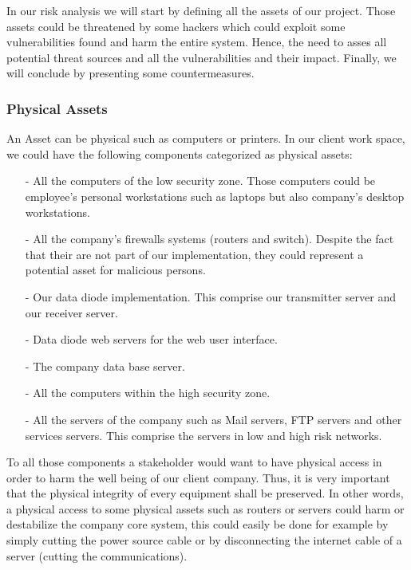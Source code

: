 \documentclass[a4paper,10pt]{article}
\begin{document}
In our risk analysis we will start by defining all the assets of our project. Those assets could be threatened by some hackers which could exploit some vulnerabilities found and harm the entire system. Hence, the need to asses all potential threat sources and all the vulnerabilities and their impact. Finally, we will conclude by presenting some countermeasures.

\subsubsection{Physical Assets}
An Asset can be physical such as computers or printers. In our client work space, we could have the following components categorized as physical assets:
\begin{enumerate}
\item[-] All the computers of the low security zone. Those computers could be employee's personal workstations such as laptops but also company's desktop workstations.
\item[-] All the company's firewalls systems (routers and switch). Despite the fact that their are not part of our implementation, they could represent a potential asset for malicious persons.
\item[-] Our data diode implementation. This comprise our transmitter server and our receiver server.
\item[-] Data diode web servers for the web user interface.
\item[-] The company data base server.
\item[-] All the computers within the high security zone.
\item[-] All the servers of the company such as Mail servers, FTP servers and other services servers. This comprise the servers in low and high risk networks.

\end{enumerate}
To all those components a stakeholder would want to have physical access in order to harm the well being of our client company. Thus, it is very important that the physical integrity of every equipment shall be preserved. In other words, a physical access to some physical assets such as routers or servers could harm or destabilize the company core system, this could easily be done for example by simply cutting the power source cable or by disconnecting the internet cable of a server (cutting the communications).
\end{document}
